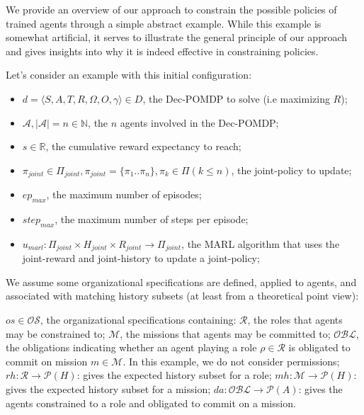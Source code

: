\begin{proofoutline}\label{proof:jpc_to_ac}

    We provide an overview of our approach to constrain the possible policies of trained agents through a simple abstract example. While this example is somewhat artificial, it serves to illustrate the general principle of our approach and gives insights into why it is indeed effective in constraining policies.

    \noindent Let's consider an example with this initial configuration:

    \begin{itemize}
        \item $d=\langle S,A,T,R,\Omega, O, \gamma \rangle \in D$, the Dec-POMDP to solve (i.e maximizing $R$);
        \item $\mathcal{A}, |\mathcal{A}| = n \in \mathbb{N}$, the  $n$ agents involved in the Dec-POMDP;
        \item $s \in \mathbb{R}$, the cumulative reward expectancy to reach;
        \item $\pi_{joint} \in \Pi_{joint}, \allowbreak \pi_{joint} = \{\pi_1..\pi_n\}, \pi_k \in \Pi (k \leq n)$, the joint-policy to update;
        \item $ep_{max}$, the maximum number of episodes;
        \item $step_{max}$, the maximum number of steps per episode;
        \item $u_{marl}: \Pi_{joint} \times H_{joint} \times R_{joint} \rightarrow \Pi_{joint}$, the MARL algorithm that uses the joint-reward and joint-history to update a joint-policy;
    \end{itemize}
    \noindent We assume some organizational specifications are defined, applied to agents, and associated with matching history subsets (at least from a theoretical point view):
    \item $os \in \mathcal{OS}$, the organizational specifications containing: $\mathcal{R}$, the roles that agents may be constrained to; $\mathcal{M}$, the missions that agents may be committed to; $\mathcal{OBL}$, the obligations indicating whether an agent playing a role $\rho \in \mathcal{R}$ is obligated to commit on mission $m \in \mathcal{M}$. In this example, we do not consider permissions; $rh: \mathcal{R} \rightarrow \mathcal{P}(H)$: gives the expected history subset for a role; $mh: \mathcal{M} \rightarrow \mathcal{P}(H)$: gives the expected history subset for a mission; $da: \mathcal{OBL} \rightarrow \mathcal{P}(A)$: gives the agents constrained to a role and obligated to commit on a mission.


\end{proofoutline}
